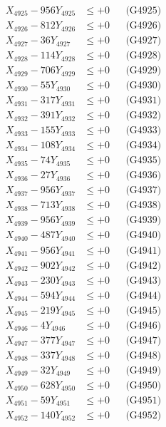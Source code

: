 \documentclass[a4paper,10pt]{article}
\begin{document}
{\begin{align}
X_{4925} - 956Y_{4925} &\leq +0 && \text{(G4925)} \\
X_{4926} - 812Y_{4926} &\leq +0 && \text{(G4926)} \\
X_{4927} - 36Y_{4927} &\leq +0 && \text{(G4927)} \\
X_{4928} - 114Y_{4928} &\leq +0 && \text{(G4928)} \\
X_{4929} - 706Y_{4929} &\leq +0 && \text{(G4929)} \\
X_{4930} - 55Y_{4930} &\leq +0 && \text{(G4930)} \\
\allowbreak
X_{4931} - 317Y_{4931} &\leq +0 && \text{(G4931)} \\
X_{4932} - 391Y_{4932} &\leq +0 && \text{(G4932)} \\
X_{4933} - 155Y_{4933} &\leq +0 && \text{(G4933)} \\
X_{4934} - 108Y_{4934} &\leq +0 && \text{(G4934)} \\
X_{4935} - 74Y_{4935} &\leq +0 && \text{(G4935)} \\
X_{4936} - 27Y_{4936} &\leq +0 && \text{(G4936)} \\
X_{4937} - 956Y_{4937} &\leq +0 && \text{(G4937)} \\
X_{4938} - 713Y_{4938} &\leq +0 && \text{(G4938)} \\
X_{4939} - 956Y_{4939} &\leq +0 && \text{(G4939)} \\
X_{4940} - 487Y_{4940} &\leq +0 && \text{(G4940)} \\
\allowbreak
X_{4941} - 956Y_{4941} &\leq +0 && \text{(G4941)} \\
X_{4942} - 902Y_{4942} &\leq +0 && \text{(G4942)} \\
X_{4943} - 230Y_{4943} &\leq +0 && \text{(G4943)} \\
X_{4944} - 594Y_{4944} &\leq +0 && \text{(G4944)} \\
X_{4945} - 219Y_{4945} &\leq +0 && \text{(G4945)} \\
X_{4946} - 4Y_{4946} &\leq +0 && \text{(G4946)} \\
X_{4947} - 377Y_{4947} &\leq +0 && \text{(G4947)} \\
X_{4948} - 337Y_{4948} &\leq +0 && \text{(G4948)} \\
X_{4949} - 32Y_{4949} &\leq +0 && \text{(G4949)} \\
X_{4950} - 628Y_{4950} &\leq +0 && \text{(G4950)} \\
\allowbreak
X_{4951} - 59Y_{4951} &\leq +0 && \text{(G4951)} \\
X_{4952} - 140Y_{4952} &\leq +0 && \text{(G4952)} \\

\end{align}}
\end{document}
